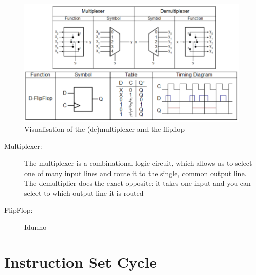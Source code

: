 \documentclass[a4paper, 11pt, nofootinbib]{article}
\begin{document}
\begin{figure}[htb]
	\centering
	\includegraphics[keepaspectratio=true,height=12\baselineskip]{flipflop.PNG}
	\caption{Visualisation of the (de)multiplexer and the flipflop}
	\label{fig:multFlip}
\end{figure}

\begin{description}
	\item[Multiplexer: ] The multiplexer is a combinational logic circuit, which allows us to select one of many input lines and route it to the single, common output line. The demultiplier does the exact opposite: it takes one input and you can select to which output line it is routed
	\item[FlipFlop: ] Idunno %
\end{description}

\newpage

\section{Instruction Set Cycle}
\end{document}
